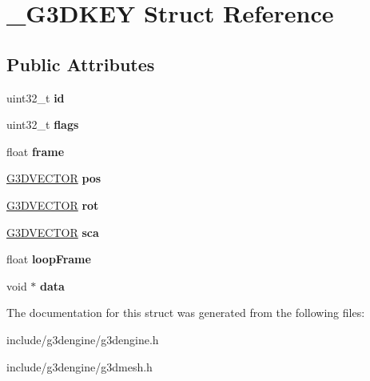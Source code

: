 \hypertarget{struct__G3DKEY}{}\section{\+\_\+\+G3\+D\+K\+EY Struct Reference}
\label{struct__G3DKEY}
\subsection*{Public Attributes}
\begin{DoxyCompactItemize}
\item 
\mbox{\label{struct__G3DKEY_a43bc7d3547652af28482552627ec2350}} 
uint32\+\_\+t {\bfseries id}
\item 
\mbox{\label{struct__G3DKEY_a3944f2113407995b405cc4268423bc9f}} 
uint32\+\_\+t {\bfseries flags}
\item 
\mbox{\label{struct__G3DKEY_abea416321d993febf69bc8c40c1832b0}} 
float {\bfseries frame}
\item 
\mbox{\label{struct__G3DKEY_a0b90d803b6364ddce5c29641937d9d36}} 
\hyperlink{struct__G3DVECTOR}{G3\+D\+V\+E\+C\+T\+OR} {\bfseries pos}
\item 
\mbox{\label{struct__G3DKEY_a33ea9fd4b842cf89a75c6859d55c7a67}} 
\hyperlink{struct__G3DVECTOR}{G3\+D\+V\+E\+C\+T\+OR} {\bfseries rot}
\item 
\mbox{\label{struct__G3DKEY_a47c46133644851aa69e9284ceff91508}} 
\hyperlink{struct__G3DVECTOR}{G3\+D\+V\+E\+C\+T\+OR} {\bfseries sca}
\item 
\mbox{\label{struct__G3DKEY_ab1e1871f1fd3235943bff0f9a3588a45}} 
float {\bfseries loop\+Frame}
\item 
\mbox{\label{struct__G3DKEY_a46b58ceb251c2d4f490eee5bc81ee26b}} 
void $\ast$ {\bfseries data}
\end{DoxyCompactItemize}


The documentation for this struct was generated from the following files\+:\begin{DoxyCompactItemize}
\item 
include/g3dengine/g3dengine.\+h\item 
include/g3dengine/g3dmesh.\+h\end{DoxyCompactItemize}
